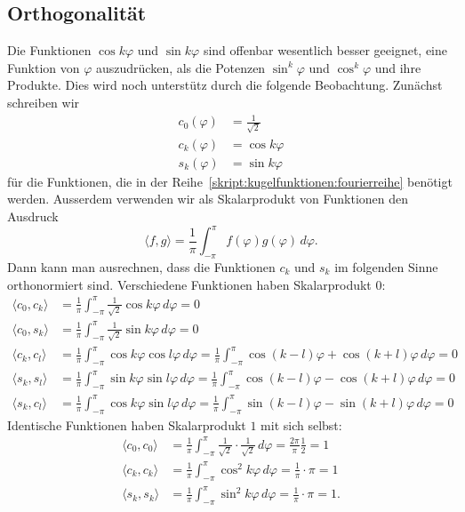 \subsection{Orthogonalität}
Die Funktionen $\cos k\varphi$ und $\sin k\varphi$ sind offenbar 
wesentlich besser geeignet, eine Funktion von $\varphi$ auszudrücken,
als die Potenzen $\sin^k\varphi$ und $\cos^k\varphi$ und ihre Produkte.
Dies wird noch unterstütz durch die folgende Beobachtung.
Zunächst schreiben wir
\begin{align*}
c_0(\varphi)&=\frac{1}{\sqrt{2}}
\\
c_k(\varphi)&=\cos k\varphi
\\
s_k(\varphi)&=\sin k\varphi
\end{align*}
für die Funktionen, die in der
Reihe~\eqref{skript:kugelfunktionen:fourierreihe}
benötigt werden.
Ausserdem verwenden wir als Skalarprodukt von Funktionen
den Ausdruck
\begin{equation}
\langle f,g\rangle
=
\frac1{\pi}
\int_{-\pi}^{\pi}
f(\varphi)g(\varphi)
\,d\varphi.
\end{equation}
Dann kann man ausrechnen, dass die Funktionen $c_k$ und $s_k$ im
folgenden Sinne orthonormiert sind.
Verschiedene Funktionen haben Skalarprodukt $0$:
\begin{align*}
\langle c_0,c_k\rangle
&=
\frac{1}{\pi}\int_{-\pi}^\pi \frac{1}{\sqrt{2}}\cos k\varphi\,d\varphi=0
\\
\langle c_0,s_k\rangle
&=
\frac{1}{\pi}\int_{-\pi}^\pi \frac{1}{\sqrt{2}}\sin k\varphi\,d\varphi=0
\\
\langle c_k,c_l\rangle
&=
\frac1{\pi}
\int_{-\pi}^{\pi}
\cos k\varphi\cos l\varphi
\,d\varphi
=
\frac1{\pi}
\int_{-\pi}^{\pi}
\cos(k-l)\varphi + \cos(k+l)\varphi
\,d\varphi
=0
\\
\langle s_k,s_l\rangle
&=
\frac1{\pi}
\int_{-\pi}^{\pi}
\sin k\varphi\sin l\varphi
\,d\varphi
=
\frac1{\pi}
\int_{-\pi}^{\pi}
\cos(k-l)\varphi - \cos(k+l)\varphi
\,d\varphi
=0
\\
\langle s_k,c_l\rangle
&=
\frac1{\pi}
\int_{-\pi}^{\pi}
\cos k\varphi\sin l\varphi
\,d\varphi
=
\frac1{\pi}
\int_{-\pi}^{\pi}
\sin(k-l)\varphi - \sin(k+l)\varphi
\,d\varphi
=0
\end{align*}
Identische Funktionen haben Skalarprodukt $1$ mit sich selbst:
\begin{align*}
\langle c_0,c_0\rangle
&=
\frac1{\pi}\int_{-\pi}^{\pi}
\frac1{\sqrt{2}}
\cdot
\frac1{\sqrt{2}}
\,d\varphi = \frac{2\pi}{\pi}\frac12=1
\\
\langle c_k,c_k\rangle
&=
\frac1{\pi}
\int_{-\pi}^{\pi}
\cos^2 k\varphi
\,d\varphi
=
\frac1{\pi}\cdot\pi = 1
\\
\langle s_k,s_k\rangle
&=
\frac1{\pi}
\int_{-\pi}^\pi
\sin^2 k\varphi
\,d\varphi
=\frac1{\pi}\cdot\pi = 1.
\end{align*}
